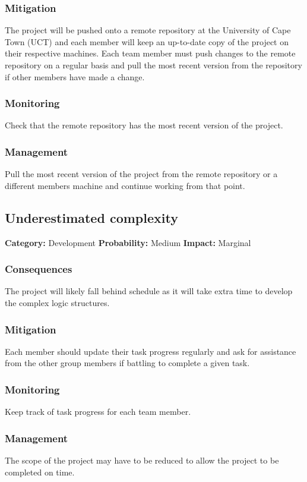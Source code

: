 \documentclass[a4paper,10pt]{article}
\begin{document}
\subsubsection*{Mitigation}
The project will be pushed onto a remote repository at the University of Cape Town (UCT) and each member will keep an up-to-date copy of the project on their respective machines. Each team member must push changes to the remote repository on a regular basis and pull the most recent version from the repository if other members have made a change.
\subsubsection*{Monitoring}
Check that the remote repository has the most recent version of the project.
\subsubsection*{Management}
Pull the most recent version of the project from the remote repository or a different members machine and continue working from that point.

\subsection{Underestimated complexity}
\textbf{Category:} Development\newline
\textbf{Probability:} Medium\newline
\textbf{Impact:} Marginal
\subsubsection*{Consequences}
The project will likely fall behind schedule as it will take extra time to develop the complex logic structures. 
\subsubsection*{Mitigation}
Each member should update their task progress regularly and ask for assistance from the other group members if battling to complete a given task.
\subsubsection*{Monitoring}
Keep track of task progress for each team member.
\subsubsection*{Management}
The scope of the project may have to be reduced to allow the project to be completed on time. 
\end{document}
